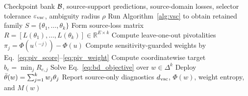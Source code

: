 \begin{algorithm}[H]
\caption{\cda{} deployment}
\label{alg:cda}
\begin{algorithmic}[1]
\Require Checkpoint bank \(\mathcal{B}\), source-support predictions, source-domain losses, selector tolerance \(\varepsilon_{\rm vsc}\), ambiguity radius \(\rho\)
\State Run Algorithm~\ref{alg:vsc} to obtain retained family \(S=\{\theta_1,\ldots,\theta_k\}\)
\State Form source-loss matrix \(R=[L(\theta_1),\ldots,L(\theta_k)]\in\mathbb{R}^{E\times k}\)
    \State Compute leave-one-out pivotalities \(\pi_j=\Phi(u^{(-j)})-\Phi(u)\)
    \State Compute sensitivity-guarded weights by Eq.~\eqref{eq:piv_score}--\eqref{eq:piv_weight}
\Else
    \State Compute coordinatewise target \(b_e=\min_j R_{e,j}\)
    \State Solve Eq.~\eqref{eq:bd_objective} over \(w\in\Delta^k\)
\EndIf
\State Deploy \(\bar{\theta}(w)=\sum_{j=1}^k w_j\theta_j\)
\State Report source-only diagnostics \(d_{\rm vsc}\), \(\Phi(w)\), weight entropy, and \(M(w)\)
\end{algorithmic}
\end{algorithm}
